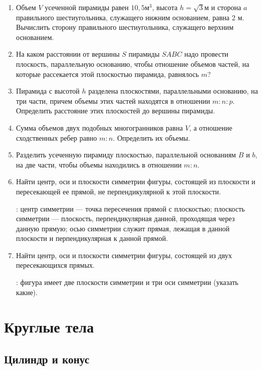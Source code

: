 \documentclass[twoside]{book}
\begin{document}
\begin{enumerate}
\item
Объем $V$ усеченной пирамиды равен $10{,}5\text{м}^3$, высота $h = \sqrt{3}\text{м}$ и сторона $a$ правильного шестиугольника, служащего нижним основанием, равна 2 м.
Вычислить сторону правильного шестиугольника, служащего верхним основанием.

\item
На каком расстоянии от вершины $S$ пирамиды $SABC$ надо провести плоскость, параллельную основанию, чтобы отношение объемов частей, на которые рассекается этой плоскостью пирамида, равнялось $m$?

\item
Пирамида с высотой $h$ разделена плоскостями, параллельными основанию, на три части, причем объемы этих частей находятся в отношении $m : n : p$.
Определить расстояние этих плоскостей до вершины пирамиды.

\item
Сумма объемов двух подобных многогранников равна $V$, а отношение сходственных ребер равно $m:n$. %
Определить их объемы.

\item
Разделить усеченную пирамиду плоскостью, параллельной основаниям $B$ и $b$, на две части, чтобы объемы находились в отношении $m:n$.

\item
Найти центр, оси и плоскости симметрии фигуры, состоящей из плоскости и пересекающей ее прямой, не перпендикулярной к этой плоскости.

: центр симметрии --- точка пересечения прямой с плоскостью;
плоскость симметрии --- плоскость, перпендикулярная данной, проходящая через данную прямую;
осью симметрии служит прямая, лежащая в данной плоскости и перпендикулярная к данной прямой.

\item
Найти центр, оси и плоскости симметрии фигуры, состоящей из двух пересекающихся прямых.

: фигура имеет две плоскости симметрии и три оси симметрии (указать какие). %
\end{enumerate}
\chapter{Круглые тела}


\section{Цилиндр и конус}
\end{document}
